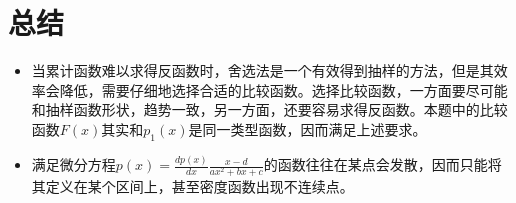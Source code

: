 \documentclass[UTF8]{ctexart}
\begin{document}
	\section{总结}
	\begin{itemize}
		\item 当累计函数难以求得反函数时，舍选法是一个有效得到抽样的方法，但是其效率会降低，需要仔细地选择合适的比较函数。选择比较函数，一方面要尽可能和抽样函数形状，趋势一致，另一方面，还要容易求得反函数。本题中的比较函数$F(x)$其实和$p_1(x)$是同一类型函数，因而满足上述要求。
		
		\item 满足微分方程$p(x)=\frac{dp(x)}{dx}\frac{x-d}{ax^2+bx+c}$的函数往往在某点会发散，因而只能将其定义在某个区间上，甚至密度函数出现不连续点。
	\end{itemize}
	\clearpage
\end{document}

